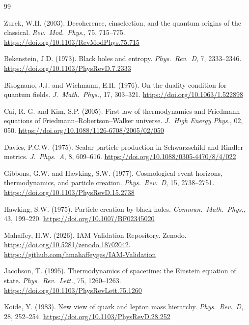 \documentclass[12pt,a4paper]{article}
\begin{document}
\begin{thebibliography}{99}

Zurek, W.H. (2003).
Decoherence, einselection, and the quantum origins of the classical.
\textit{Rev.\ Mod.\ Phys.}, 75, 715--775.
\url{https://doi.org/10.1103/RevModPhys.75.715}

Bekenstein, J.D. (1973).
Black holes and entropy.
\textit{Phys.\ Rev.\ D}, 7, 2333--2346.
\url{https://doi.org/10.1103/PhysRevD.7.2333}

Bisognano, J.J. and Wichmann, E.H. (1976).
On the duality condition for quantum fields.
\textit{J.\ Math.\ Phys.}, 17, 303--321.
\url{https://doi.org/10.1063/1.522898}

Cai, R.-G. and Kim, S.P. (2005).
First law of thermodynamics and Friedmann equations of
Friedmann--Robertson--Walker universe.
\textit{J.\ High Energy Phys.}, 02, 050.
\url{https://doi.org/10.1088/1126-6708/2005/02/050}

Davies, P.C.W. (1975).
Scalar particle production in Schwarzschild and Rindler metrics.
\textit{J.\ Phys.\ A}, 8, 609--616.
\url{https://doi.org/10.1088/0305-4470/8/4/022}

Gibbons, G.W. and Hawking, S.W. (1977).
Cosmological event horizons, thermodynamics, and particle creation.
\textit{Phys.\ Rev.\ D}, 15, 2738--2751.
\url{https://doi.org/10.1103/PhysRevD.15.2738}

Hawking, S.W. (1975).
Particle creation by black holes.
\textit{Commun.\ Math.\ Phys.}, 43, 199--220.
\url{https://doi.org/10.1007/BF02345020}

Mahaffey, H.W. (2026).
IAM Validation Repository.
Zenodo. \url{https://doi.org/10.5281/zenodo.18702042}.
\url{https://github.com/hmahaffeyges/IAM-Validation}

Jacobson, T. (1995).
Thermodynamics of spacetime: the Einstein equation of state.
\textit{Phys.\ Rev.\ Lett.}, 75, 1260--1263.
\url{https://doi.org/10.1103/PhysRevLett.75.1260}

Koide, Y. (1983).
New view of quark and lepton mass hierarchy.
\textit{Phys.\ Rev.\ D}, 28, 252--254.
\url{https://doi.org/10.1103/PhysRevD.28.252}


\end{thebibliography}
\end{document}
